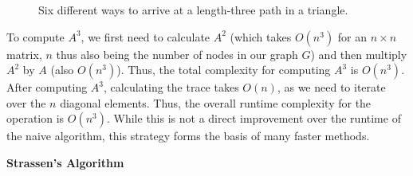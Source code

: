 \documentclass[11pt]{article}
\newcommand{\subsubsubsection}[1]{
  \vspace{1em} %
  \noindent\textbf{#1} %
  \vspace{0.5em} %
}
\begin{document}
\begin{figure}[H]
\begin{subfigure}{0.15\textwidth}
    \end{subfigure}
    \begin{subfigure}{0.15\textwidth}
        \centering
    \end{subfigure}
    \begin{subfigure}{0.15\textwidth}
        \centering
    \end{subfigure}
    \caption{Six different ways to arrive at a length-three path in a triangle.}
    \label{fig:triangle-traversal}
\end{figure}

To compute $A^3$, we first need to calculate $A^2$ (which takes $O(n^3)$ for an $n \times n$ matrix, $n$ thus also being the number of nodes in our graph $G$) and then multiply $A^2$ by $A$ (also $O(n^3)$).
Thus, the total complexity for computing $A^3$ is $O(n^3)$.
After computing $A^3$, calculating the trace takes $O(n)$, as we need to iterate over the $n$ diagonal elements.
Thus, the overall runtime complexity for the operation is $O(n^3)$.
While this is not a direct improvement over the runtime of the naive algorithm, this strategy forms the basis of many faster methods.

\subsubsubsection{Strassen's Algorithm}
\end{document}
